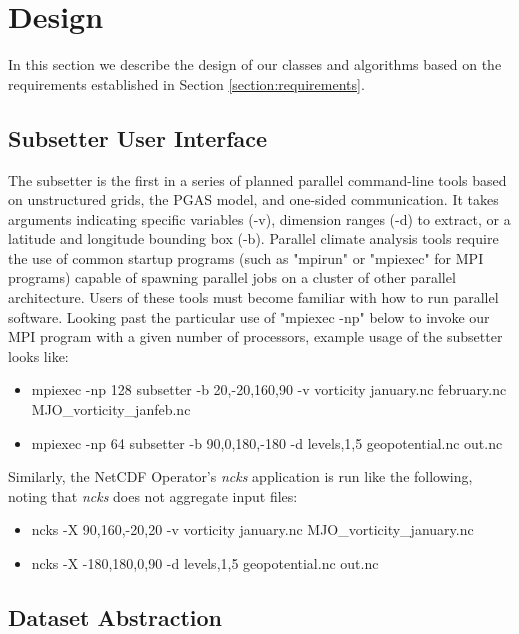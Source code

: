 \section{Design}
\label{section:design}

In this section we describe the design of our classes and algorithms based on
the requirements established in Section \ref{section:requirements}.

\subsection{Subsetter User Interface}

The subsetter is the first in a series of planned parallel command-line tools
based on unstructured grids, the PGAS model, and one-sided communication.  It
takes arguments indicating specific variables (-v), dimension ranges (-d) to
extract, or a latitude and longitude bounding box (-b).  Parallel climate
analysis tools require the use of common startup programs (such as "mpirun" or
"mpiexec" for MPI programs) capable of spawning parallel jobs on a cluster of
other parallel architecture.  Users of these tools must become familiar with
how to run parallel software.  Looking past the particular use of "mpiexec
-np" below to invoke our MPI program with a given number of processors,
example usage of the subsetter looks like:

\begin{itemize}
\item mpiexec -np 128 subsetter -b 20,-20,160,90 -v vorticity january.nc february.nc MJO\_vorticity\_janfeb.nc
\item mpiexec -np 64 subsetter -b 90,0,180,-180 -d levels,1,5 geopotential.nc out.nc
\end{itemize}

Similarly, the NetCDF Operator's \emph{ncks} application\cite{NCO} is run
like the following, noting that \emph{ncks} does not aggregate input files:

\begin{itemize}
\item ncks -X 90,160,-20,20 -v vorticity january.nc MJO\_vorticity\_january.nc
\item ncks -X -180,180,0,90 -d levels,1,5 geopotential.nc out.nc
\end{itemize}

\subsection{Dataset Abstraction}

